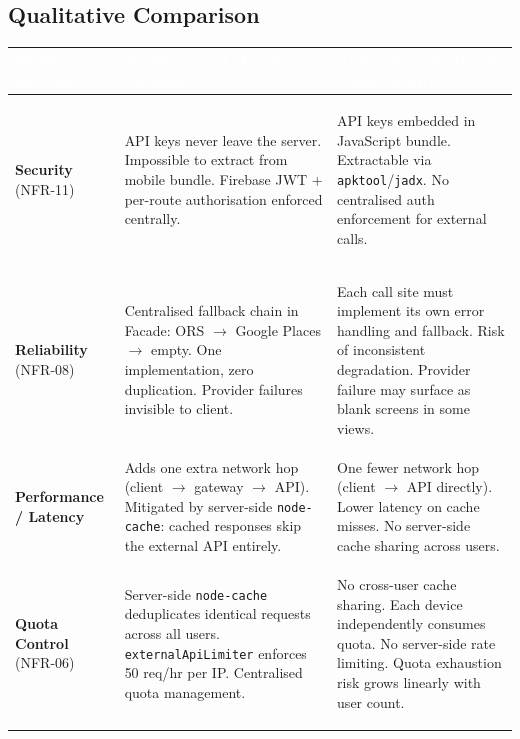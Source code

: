 \documentclass[12pt, a4paper]{article}
\newcommand{\thcell}[1]{\textcolor{white}{\textbf{\small #1}}}
\newcommand{\code}[1]{\texttt{\small #1}}
\newcommand{\reqid}[1]{\textsc{\small #1}}
\begin{document}
\subsection{Qualitative Comparison}

\begin{longtable}{L{2.8cm} L{5.2cm} L{5.2cm}}
\toprule
{}
\thcell{Quality Attribute} & \thcell{Architecture A: Facade + Gateway} & \thcell{Architecture B: Direct Client-to-API} \\
\midrule
\endhead
\bottomrule
\endfoot

\textbf{Security} (\reqid{NFR-11}) &
\begin{tcolorbox}[winbox]
API keys never leave the server. Impossible to extract from mobile bundle. Firebase JWT + per-route authorisation enforced centrally.
\end{tcolorbox} &
\begin{tcolorbox}[losebox]
API keys embedded in JavaScript bundle. Extractable via \code{apktool}/\code{jadx}. No centralised auth enforcement for external calls.
\end{tcolorbox} \\

\textbf{Reliability} (\reqid{NFR-08}) &
\begin{tcolorbox}[winbox]
Centralised fallback chain in Facade: ORS $\to$ Google Places $\to$ empty. One implementation, zero duplication. Provider failures invisible to client.
\end{tcolorbox} &
\begin{tcolorbox}[losebox]
Each call site must implement its own error handling and fallback. Risk of inconsistent degradation. Provider failure may surface as blank screens in some views.
\end{tcolorbox} \\

\textbf{Performance / Latency} &
Adds one extra network hop (client $\to$ gateway $\to$ API). Mitigated by server-side \code{node-cache}: cached responses skip the external API entirely. &
One fewer network hop (client $\to$ API directly). Lower latency on cache misses. No server-side cache sharing across users. \\

\textbf{Quota Control} (\reqid{NFR-06}) &
\begin{tcolorbox}[winbox]
Server-side \code{node-cache} deduplicates identical requests across all users. \code{externalApiLimiter} enforces 50 req/hr per IP. Centralised quota management.
\end{tcolorbox} &
\begin{tcolorbox}[losebox]
No cross-user cache sharing. Each device independently consumes quota. No server-side rate limiting. Quota exhaustion risk grows linearly with user count.
\end{tcolorbox} \\


\end{longtable}
\end{document}
